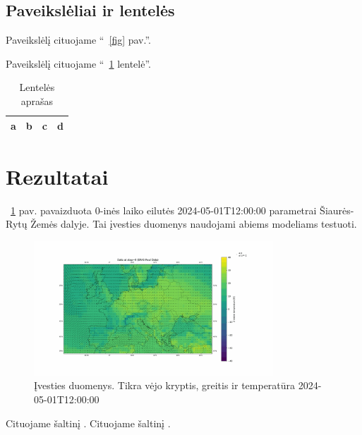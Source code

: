 \documentclass[conference]{IEEEtran}
\begin{document}
\subsection{Paveikslėliai ir lentelės}

Paveikslėlį cituojame ``~\ref{fig} pav.''.

Paveikslėlį cituojame ``~\ref{tab1} lentelė''.

\begin{table}[htbp]
\caption{Lentelės aprašas}
\begin{center}
\begin{tabular}{|c|c|c|c|}
\hline
a & b & c &  d \\
\hline
\end{tabular}
\label{tab1}
\end{center}
\end{table}


\newpage
\section{Rezultatai}

~\ref{fig1} pav. pavaizduota 0-inės laiko eilutės 2024-05-01T12:00:00 parametrai Šiaurės-Rytų Žemės dalyje. Tai įvesties duomenys naudojami abiems modeliams testuoti.

\begin{figure}[htb!] %
\centerline{\includegraphics[width=0.8\textwidth]{img/frame_0_delay-1s.png}}
\caption{Įvesties duomenys. Tikra vėjo kryptis, greitis ir temperatūra 2024-05-01T12:00:00}
\label{fig1}
\end{figure}



Cituojame šaltinį \cite{lecun2015deep}.
Cituojame šaltinį \cite{bi2023accurate}.



\end{document}
